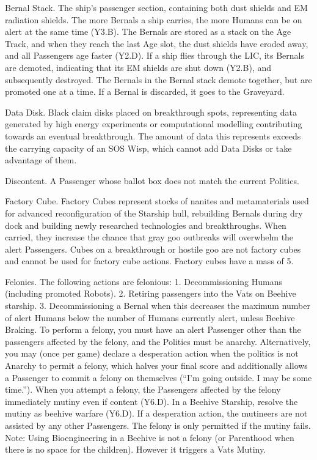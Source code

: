 \documentclass[a4paper]{book}
\begin{document}
Bernal Stack. The ship’s passenger section, containing both dust shields and EM radiation shields. The more Bernals a ship carries, the more Humans can be on alert at the same time (Y3.B). The Bernals are stored as a stack on the Age Track, and when they reach the last Age slot, the dust shields have eroded away, and all Passengers age faster (Y2.D). If a ship flies through the LIC, its Bernals are demoted, indicating that its EM shields are shut down (Y2.B), and subsequently destroyed. The Bernals in the Bernal stack demote together, but are promoted one at a time. If a Bernal is discarded, it goes to the Graveyard.

Data Disk. Black claim disks placed on breakthrough spots, representing data generated by high energy experiments or computational modelling contributing towards an eventual breakthrough. The amount of data this represents exceeds the carrying capacity of an SOS Wisp, which cannot add Data Disks or take advantage of them.

Discontent. A Passenger whose ballot box does not match the current Politics.

Factory Cube. Factory Cubes represent stocks of nanites and metamaterials used for advanced reconfiguration of the Starship hull, rebuilding Bernals during dry dock and building newly researched technologies and breakthroughs. When carried, they increase the chance that gray goo outbreaks will overwhelm the alert Passengers. Cubes on a breakthrough or hostile goo are not factory cubes and cannot be used for factory cube actions. Factory cubes have a mass of 5.

Felonies. The following actions are felonious:
1. Decommissioning Humans (including promoted Robots).
2. Retiring passengers into the Vats on Beehive starship.
3. Decommissioning a Bernal when this decreases the maximum number of alert Humans below the number of Humans currently alert, unless Beehive Braking.
To perform a felony, you must have an alert Passenger other than the passengers affected by the felony, and the Politics must be anarchy. Alternatively, you may (once per game) declare a desperation action when the politics is not Anarchy to permit a felony, which halves your final score and additionally allows a Passenger to commit a felony on themselves (“I’m going outside. I may be some time.”).
When you attempt a felony, the Passengers affected by the felony immediately mutiny even if content (Y6.D). In a Beehive Starship, resolve the mutiny as beehive warfare (Y6.D). If a desperation action, the mutineers are not assisted by any other Passengers. The felony is only permitted if the mutiny fails.
Note: Using Bioengineering in a Beehive is not a felony (or Parenthood when there is no space for the children). However it triggers a Vats Mutiny.
\end{document}
